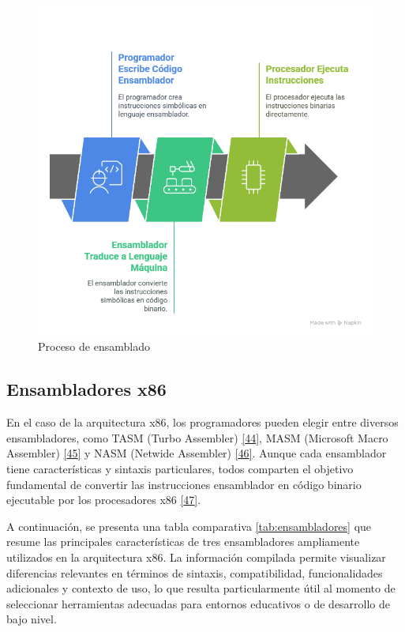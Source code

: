 \documentclass[12pt,oneside]{templates/unerthesis}
\begin{document}
\begin{figure}

{\centering \includegraphics[width=1\linewidth]{images/ensamblador} 

}

\caption{Proceso de ensamblado}\label{fig:ensambla}
\end{figure}

\hypertarget{ensambladores-x86}{%
\subsection{Ensambladores x86}\label{ensambladores-x86}}

En el caso de la arquitectura x86, los programadores pueden elegir entre diversos ensambladores, como TASM (Turbo Assembler) \protect\hyperlink{ref-tasm}{{[}44{]}}, MASM (Microsoft Macro Assembler) \protect\hyperlink{ref-masm}{{[}45{]}} y NASM (Netwide Assembler) \protect\hyperlink{ref-nasm}{{[}46{]}}. Aunque cada ensamblador tiene características y sintaxis particulares, todos comparten el objetivo fundamental de convertir las instrucciones ensamblador en código binario ejecutable por los procesadores x86 \protect\hyperlink{ref-hyde2010art}{{[}47{]}}.

A continuación, se presenta una tabla comparativa \ref{tab:ensambladores} que resume las principales características de tres ensambladores ampliamente utilizados en la arquitectura x86. La información compilada permite visualizar diferencias relevantes en términos de sintaxis, compatibilidad, funcionalidades adicionales y contexto de uso, lo que resulta particularmente útil al momento de seleccionar herramientas adecuadas para entornos educativos o de desarrollo de bajo nivel.
\end{document}
